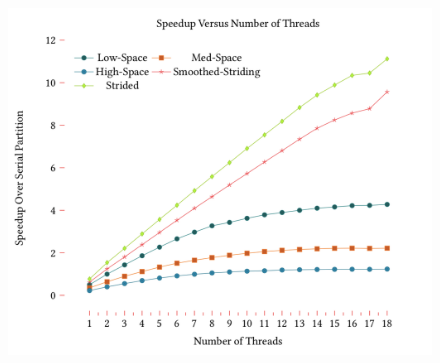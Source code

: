 \documentclass[sigconf, 10pt, nonacm]{acmart}
\theoremstyle{remark}
\theoremstyle{remark}
\begin{document}


\begin{figure}[h]
  \includegraphics[width=\linewidth]{graph_performance.png}
\end{figure}
\end{document}
